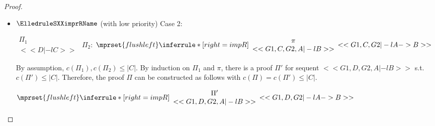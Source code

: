 \begin{proof}
\begin{enumerate}
\begin{itemize}
  \item $\ElledruleSXXimprRName$ (with low priority) Case 2:
      \begin{center}
        \scriptsize
        \begin{math}
          \begin{array}{c}
            \Pi_1 \\
            {<<D |-l C>>}
          \end{array}
        \end{math}
        \qquad\qquad
        $\Pi_2$:
        \begin{math}
          $$\mprset{flushleft}
          \inferrule* [right={\tiny impR}] {
            {
              \begin{array}{c}
                \pi \\
                {<<G1, C, G2, A |-l B>>}
              \end{array}
            }
          }{<<G1, C, G2 |-l A -> B>>}
        \end{math}
      \end{center}
      By assumption, $c(\Pi_1),c(\Pi_2)\leq |C|$. By induction on $\Pi_1$ and $\pi$, there
      is a proof $\Pi'$ for sequent $<<G1, D, G2, A |-l B>>$ s.t. $c(\Pi') \leq |C|$.
      Therefore, the proof $\Pi$ can be constructed as follows with
      $c(\Pi) = c(\Pi') \leq |C|$.
      \begin{center}
        \scriptsize
        \begin{math}
          $$\mprset{flushleft}
          \inferrule* [right={\tiny impR}] {
            {
              \begin{array}{c}
                \Pi' \\
                {<<G1, D, G2, A |-l B>>}
              \end{array}
            }
          }{<<G1, D, G2 |-l A -> B>>}
        \end{math}
      \end{center}


\end{itemize}
\end{enumerate}
\end{proof}
